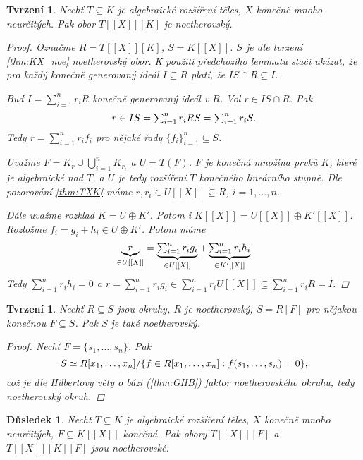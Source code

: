 \documentclass[11pt,a4paper]{article}
\newcommand*{\ml}[1]{\[\textstyle\let\displaystyle\textstyle#1\]}	%
\newcounter{numb}
\theoremstyle{definition}
\theoremstyle{plain}
\newtheorem{tvrzeni}[numb]{Tvrzení}
\newtheorem{dusledek}[numb]{Důsledek}
\begin{document}
\begin{tvrzeni}
	Nechť $T \subseteq K$ je algebraické rozšíření těles, $X$ konečně mnoho neurčitých. Pak obor $T[[X]][K]$ je noetherovský.

	\begin{proof}
		\newcommand*\I{_{i = 1}^n}

		Označme $R = T[[X]][K]$, $S = K[[X]]$. $S$ je dle tvrzení \ref{thm:KX_noe} noetherovský obor. K použití předchozího lemmatu stačí ukázat, že pro každý konečně generovaný ideál $I \subseteq R$ platí, že $IS \cap R \subseteq I$.

		Buď $I = \sum\I r_i R$ konečně generovaný ideál v $R$. Vol $r \in IS \cap R$. Pak
		\ml{
			r \in IS = \sum\I r_i RS = \sum\I r_i S.
		}
		Tedy $r = \sum\I r_i f_i$ pro nějaké řady $\{f_i\}\I \subseteq S$.

		Uvažme $F = K_r \cup \bigcup\I K_{r_i}$ a $U = T(F)$. $F$ je konečná množina prvků $K$, které je algebraické nad $T$, a $U$ je tedy rozšíření $T$ konečného lineárního stupně. Dle pozorování \ref{thm:TXK} máme $r, r_i \in U[[X]] \subseteq R$, $i = 1, \hdots, n$.

		Dále uvažme rozklad $K = U \oplus K'$. Potom i $K[[X]] = U[[X]] \oplus K'[[X]]$. Rozložme $f_i = g_i + h_i \in U \oplus K'$. Potom máme
		\ml{
			\underbrace{r}_{\in U[[X]]} = \underbrace{\sum\I r_i g_i}_{\in U[[X]]} + \underbrace{\sum\I r_i h_i}_{\in K'[[X]]}
		}
		Tedy $\sum\I r_i h_i = 0$ a $r = \sum\I r_i g_i \in \sum\I r_i U[[X]] \subseteq \sum\I r_i R = I$.
	\end{proof}
\end{tvrzeni}

\begin{tvrzeni}
	Nechť $R \subseteq S$ jsou okruhy, $R$ je noetherovský, $S = R[F]$ pro nějakou konečnou $F \subseteq S$. Pak $S$ je také noetherovský.

	\begin{proof}
		Nechť $F = \{s_1, \hdots, s_n\}$. Pak
		\ml{
			S \simeq R[x_1, \hdots, x_n] / \{f \in R[x_1, \hdots, x_n]: f(s_1, \hdots, s_n) = 0\},
		}
		což je dle Hilbertovy věty o bázi (\ref{thm:GHB}) faktor noetherovského okruhu, tedy noetherovský okruh.
	\end{proof}
\end{tvrzeni}

\begin{dusledek} \label{thm:noe}
	Nechť $T \subseteq K$ je algebraické rozšíření těles, $X$ konečně mnoho neurčitých, $F \subseteq K[[X]]$ konečná. Pak obory $T[[X]][F]$ a $T[[X]][K][F]$ jsou noetherovské.
\end{dusledek}
\end{document}
